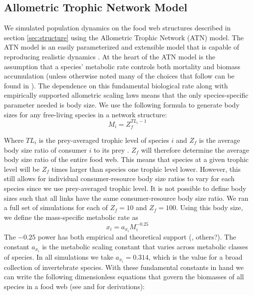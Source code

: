 \documentclass[11pt]{amsart}
\begin{document}
\subsection{Allometric Trophic Network Model}

We simulated population dynamics on the food web structures described in section \ref{sec:structure} using the Allometric Trophic Network (ATN) model.  The ATN model is an easily parameterized and extensible model that is capable of reproducing realistic dynamics \cite{Boit2012}.  At the heart of the ATN model is the assumption that a species' metabolic rate controls both mortality and biomass accumulation (unless otherwise noted many of the choices that follow can be found in \cite{Brose2006}).  The dependence on this fundamental biological rate along with empirically supported allometric scaling laws means that the only species-specific parameter needed is body size.  We use the following formula to generate body sizes for any free-living species in a network structure:
\begin{equation}
M_i= Z_f^{TL_i-1}\label{eq:mFree}
\end{equation}

Where $TL_i$ is the prey-averaged trophic level of species $i$ and $Z_f$ is the average body size ratio of consumer $i$ to its prey \cite{Martinez2004}.  $Z_f$ will therefore determine the average body size ratio of the entire food web.  This means that species at a given trophic level will be $Z_f$ times larger than species one trophic level lower.  However, this still allows for individual consumer-resource body size ratios to vary for each species since we use prey-averaged trophic level.  It is not possible to define body sizes such that all links have the same consumer-resource body size ratio.  We ran a full set of simulations for each of $Z_f = 10$ and $Z_f = 100$.  Using this body size, we define the mass-specific metabolic rate as
\begin{equation}
x_i = a_{x_i} M_i^{-0.25}\label{eq:x}
\end{equation}
The $-0.25$ power has both empirical and theoretical support (\cite{Brown2004}, others?).  The constant $a_{x_i}$ is the metabolic scaling constant that varies across metabolic classes of species.  In all simulations we take $a_{x_i}=0.314$, which is the value for a broad collection of invertebrate species.  With these fundamental constants in hand we can write the following dimensionless equations that govern the biomasses of all species in a food web (see \cite{Yodzis1992} and \cite{Willams2007} for derivations): 
\end{document}
